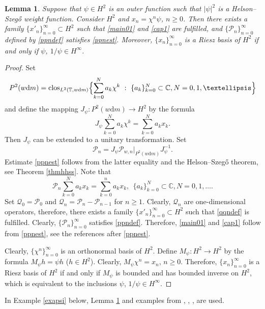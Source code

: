 \documentclass[a4paper,oneside,11pt]{amsart}
\numberwithin{equation}{section}
\theoremstyle{plain}
\newtheorem{lemma}[theorem]{Lemma}
\theoremstyle{definition}
\begin{document}
\begin{lemma} 
\label{lempsi}
Suppose that $\psi\in H^2$ is an outer function such that $|\psi|^2$ is a Helson--Szeg\H o weight function. 
Consider $H^2$ and $x_n=\chi^n\psi$, $n\geq 0$.  Then there exists a family  $\{x'_n\}_{n=0}^\infty\subset H^2$ such that  \eqref{main01} and \eqref{cap1} are fulfilled,  and
$\{\mathcal P_n\}_{n=0}^\infty$ defined by \eqref{ppndef} satisfies \eqref{ppnest}. Moreover,  $\{x_n\}_{n=0}^\infty$ is a Riesz basis of  $H^2$ if and only if  $\psi$, $1/\psi\in H^\infty$.
\end{lemma}
\begin{proof}
Set $$ P^2(w\mathrm{d}m)=\operatorname{clos}_{L^2(\mathbb T, w\mathrm{d}m)}
\Bigl\{\sum_{k=0}^N a_k \chi^k \ :\  \{a_k\}_{k=0}^N\subset \mathbb C, N=0,1,\ldots\Bigr\}$$ 
and define the mapping $J_\psi\colon P^2(w\mathrm{d}m)\to H^2$ by the formula
$$ J_\psi\sum_{k=0}^N a_k \chi^k=\sum_{k=0}^N a_k x_k.$$ 
Then $J_\psi$ can be extended to a unitary transformation. Set $$\mathcal P_n=J_\psi\mathcal P_{w,n}|_{P^2(w\mathrm{d}m)}J_\psi^{-1}.$$ 
Estimate \eqref{ppnest} follows from the latter equality and the Helson--Szeg\H o theorem, see Theorem \ref{thmhhss}. 
Note that 
$$\mathcal P_n\sum_{k=0}^N a_k x_k=\sum_{k=0}^n a_k x_k,\  \  \{a_k\}_{k=0}^N\subset \mathbb C,
 N=0,1,\ldots .$$ 
Set $\mathcal Q_0=\mathcal P_0$ and $\mathcal Q_n=\mathcal P_n-\mathcal P_{n-1}$ for $n\geq 1$. Clearly, 
$\mathcal Q_n$ are one-dimensional operators, therefore, there exists a family  $\{x'_n\}_{n=0}^\infty\subset H^2$ such that 
\eqref{qqndef} is fulfilled. 
Clearly, $\{\mathcal P_n\}_{n=0}^\infty$  satisfies \eqref{ppndef}.  Therefore, \eqref{main01} and \eqref{cap1}
follow from   \eqref{ppnest}, see the references after  \eqref{ppnest}.

Clearly, $\{\chi^n\}_{n=0}^\infty$  is an orthonormal basis of $H^2$. 
Define $M_\psi\colon H^2\to H^2$ by the formula $M_\psi h=\psi h$ ($h\in H^2$). Clearly,  $M_\psi\chi^n= x_n$, $n\geq 0$.  Therefore, $\{x_n\}_{n=0}^\infty$ is a Riesz basis of $H^2$ if and only if  $M_\psi$ is bounded and has bounded inverse on $H^2$, which is equivalent to the inclusions $\psi$, $1/\psi\in H^\infty$.  
 \end{proof}

In Example \ref{exapsi} below, Lemma \ref{lempsi} and examples from {\cite[Ch. I.A.5]{nik02}}, 
 {\cite[Sec. 2.1, Example 3.3.2]{borsp}}, {\cite[Example II.I.11.2, p. 351]{singer}}, {\cite[Ch. VIII.6]{nik86}} are used. 
\end{document}
